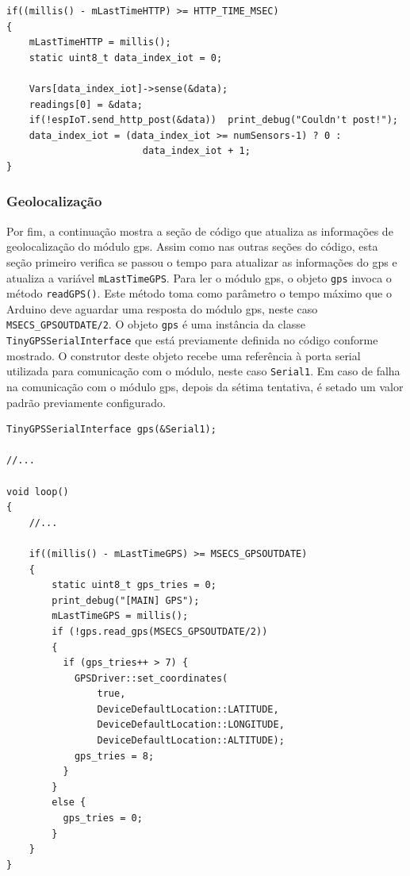 \begin{lstlisting}
if((millis() - mLastTimeHTTP) >= HTTP_TIME_MSEC)
{
    mLastTimeHTTP = millis();
    static uint8_t data_index_iot = 0;
    
    Vars[data_index_iot]->sense(&data);
    readings[0] = &data;
    if(!espIoT.send_http_post(&data))  print_debug("Couldn't post!");
    data_index_iot = (data_index_iot >= numSensors-1) ? 0 : 
                        data_index_iot + 1;
}
\end{lstlisting}

\subsubsection{Geolocalização}

Por fim, a continuação mostra a seção de código que atualiza as informações de geolocalização do módulo \acrshort{gps}. Assim como nas outras seções do código, esta seção primeiro verifica se passou o tempo para atualizar as informações do \acrshort{gps} e atualiza a variável \texttt{mLastTimeGPS}. Para ler o módulo \acrshort{gps}, o objeto \texttt{gps} invoca o método \texttt{readGPS()}. Este método toma como parâmetro o tempo máximo que o Arduino deve aguardar uma resposta do módulo \acrshort{gps}, neste caso \texttt{MSECS\_GPSOUTDATE/2}. O objeto \texttt{gps} é uma instância da classe \texttt{TinyGPSSerialInterface} que está previamente definida no código conforme mostrado. O construtor deste objeto recebe uma referência à porta serial utilizada para comunicação com o módulo, neste caso \texttt{Serial1}. Em caso de falha na comunicação com o módulo \acrshort{gps}, depois da sétima tentativa, é setado um valor padrão previamente configurado.

\begin{lstlisting}
TinyGPSSerialInterface gps(&Serial1);

//...

void loop()
{
    //...
    
    if((millis() - mLastTimeGPS) >= MSECS_GPSOUTDATE)
    {
        static uint8_t gps_tries = 0;
        print_debug("[MAIN] GPS");
        mLastTimeGPS = millis();
        if (!gps.read_gps(MSECS_GPSOUTDATE/2))
        {
          if (gps_tries++ > 7) {
            GPSDriver::set_coordinates(
                true,
                DeviceDefaultLocation::LATITUDE,
                DeviceDefaultLocation::LONGITUDE, 
                DeviceDefaultLocation::ALTITUDE);
            gps_tries = 8;
          }
        }
        else {
          gps_tries = 0;
        }
    }
}
\end{lstlisting}